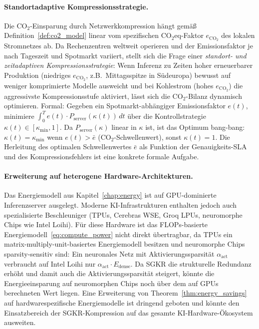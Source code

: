 ﻿\documentclass[12pt, a4paper, openany]{report}
\begin{document}
\paragraph{Standortadaptive Kompressionsstrategie.}
Die CO$_2$-Einsparung durch Netzwerkkompression hängt gemäß
Definition~\ref{def:co2_model} linear vom spezifischen CO$_2$eq-Faktor
$e_{\mathrm{CO_2}}$ des lokalen Stromnetzes ab.  Da Rechenzentren weltweit
operieren und der Emissionsfaktor je nach Tageszeit und Spotmarkt variiert,
stellt sich die Frage einer \emph{standort- und zeitadaptiven
Kompressionsstrategie}: Wenn Inferenz zu Zeiten hoher erneuerbarer
Produktion (niedriges $e_{\mathrm{CO_2}}$, z.B.\ Mittagsspitze in
Südeuropa) bewusst auf weniger komprimierte Modelle ausweicht und bei
Kohlestrom (hohes $e_{\mathrm{CO_2}}$) die aggressivste Kompressionsstufe
aktiviert, lässt sich die CO$_2$-Bilanz dynamisch optimieren.
Formal: Gegeben ein Spotmarkt-abhängiger Emissionsfaktor $e(t)$, minimiere
$\int_0^T e(t) \cdot P_{\mathrm{server}}(\kappa(t)) \,dt$ über die
Kontrollstrategie $\kappa(t) \in [\kappa_{\min}, 1]$.  Da
$P_{\mathrm{server}}(\kappa)$ linear in $\kappa$ ist, ist das Optimum
bang-bang: $\kappa(t) = \kappa_{\min}$ wenn $e(t) > \bar{e}$ (CO$_2$-Schwellenwert),
sonst $\kappa(t) = 1$.  Die Herleitung des optimalen Schwellenwertes $\bar{e}$
als Funktion der Genauigkeits-SLA und des Kompressionsfehlers ist eine
konkrete formale Aufgabe.

\paragraph{Erweiterung auf heterogene Hardware-Architekturen.}
Das Energiemodell aus Kapitel~\ref{chap:energy} ist auf GPU-dominierte
Inferenzserver ausgelegt.  Moderne KI-Infrastrukturen enthalten jedoch auch
spezialisierte Beschleuniger (TPUs, Cerebras WSE, Groq LPUs, neuromorphe
Chips wie Intel Loihi).  Für diese Hardware ist das FLOPs-basierte
Energiemodell~\eqref{eq:compute_power} nicht direkt übertragbar, da
TPUs ein matrix-multiply-unit-basiertes Energiemodell besitzen und
neuromorphe Chips sparsity-sensitiv sind: Ein neuronales Netz mit
Aktivierungssparsität $\alpha_{\mathrm{act}}$ verbraucht auf Intel Loihi
nur $\alpha_{\mathrm{act}} \cdot E_{\mathrm{dense}}$.  Da SGKR die
strukturelle Redundanz erhöht und damit auch die Aktivierungssparsität
steigert, könnte die Energieeinsparung auf neuromorphen Chips noch über
dem auf GPUs berechneten Wert liegen.  Eine Erweiterung von
Theorem~\ref{thm:energy_savings} auf hardware\-spezifische Energiemodelle
ist dringend geboten und könnte den Einsatzbereich der SGKR-Kompression
auf das gesamte KI-Hardware-Ökosystem ausweiten.
\end{document}
